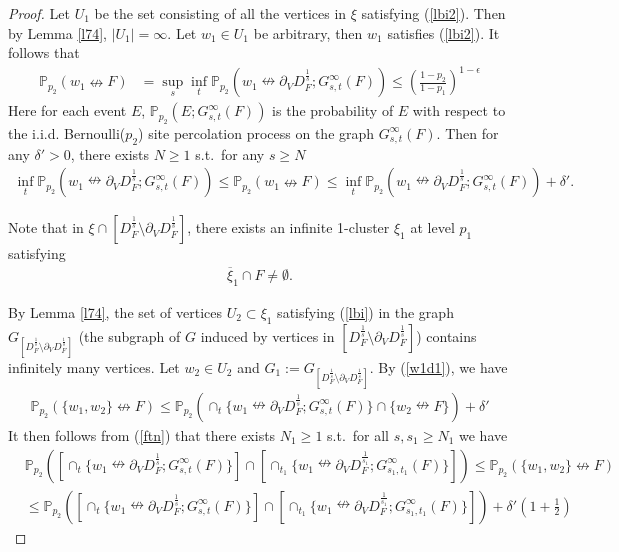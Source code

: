 \documentclass[11pt]{amsart}
\theoremstyle{plain}
\numberwithin{equation}{section}
\numberwithin{figure}{section}
\newcommand\ol{\overline}
\newcommand\PP{{\mathbb P}}
\begin{document}
\begin{proof}Let $U_1$ be the set consisting of all the vertices in $\xi$ satisfying (\ref{lbi2}). Then by Lemma \ref{l74}, $|U_1|=\infty$. Let $w_1\in U_1$ be arbitrary, then $w_1$ satisfies (\ref{lbi2}). It follows that
\begin{align}
\PP_{p_2}(w_1\nleftrightarrow F)
&=\sup_s\inf_t \PP_{p_2}(w_1\nleftrightarrow \partial_V D_F^{\frac{1}{s}};G_{s,t}^{\infty}(F))\leq \left(\frac{1-p_2}{1-p_1}\right)^{1-\epsilon}\label{ftn}
\end{align}
Here for each event $E$, $\PP_{p_2}(E;G_{s,t}^{\infty}(F))$ is the probability of $E$ with respect to the i.i.d. Bernoulli($p_2$) site percolation process on the graph $G_{s,t}^{\infty}(F)$.
Then for any $\delta'>0$, there exists $N\geq 1$ s.t.~for any $s\geq N$ 
\begin{align}
\inf_t\PP_{p_2}(w_1\nleftrightarrow \partial_V D_F^{\frac{1}{s}};G_{s,t}^{\infty}(F)) \leq\PP_{p_2}(w_1\nleftrightarrow F)\leq \inf_t\PP_{p_2}(w_1\nleftrightarrow \partial_V D_F^{\frac{1}{s}};G_{s,t}^{\infty}(F))+\delta'.\label{w1d1}
\end{align}



Note that in $\xi\cap \left[D_{F}^{\frac{1}{s}}\setminus \partial_V D_{F}^{\frac{1}{s}}\right]$, there exists an infinite 1-cluster $\xi_1$ at level $p_1$ satisfying
\begin{align*}
\ol{\xi}_1\cap F\neq \emptyset.
\end{align*}

By Lemma \ref{l74}, the set of vertices $U_2\subset \xi_1$ satisfying (\ref{lbi}) in the graph $G_{\left[D_{F}^{\frac{1}{s}}\setminus \partial_V D_{F}^{\frac{1}{s}}\right]}$ (the subgraph of $G$ induced by vertices in $\left[D_{F}^{\frac{1}{s}}\setminus \partial_V D_{F}^{\frac{1}{s}}\right]$) contains infinitely many vertices.
Let $w_2\in U_2$ and $G_1:=G_{\left[D_{F}^{\frac{1}{s}}\setminus \partial_V D_{F}^{\frac{1}{s}}\right]}$. By (\ref{w1d1}), we have 
\begin{align*}
\PP_{p_2}(\{w_1,w_2\}\nleftrightarrow F)
\leq \PP_{p_2}(\cap_t\{w_1\nleftrightarrow \partial_V D_F^{\frac{1}{s}};G_{s,t}^{\infty}(F)\}\cap\{w_2\nleftrightarrow  F\})+\delta'
\end{align*}
It then follows from (\ref{ftn}) that there exists $N_1\geq1$ s.t.~for all $s,s_1\geq N_1$ we have
\begin{align*}
&\PP_{p_2}([\cap_t\{w_1\nleftrightarrow \partial_V D_F^{\frac{1}{s}};G_{s,t}^{\infty}(F)\}]\cap[\cap_{t_1}\{w_1\nleftrightarrow \partial_V D_F^{\frac{1}{s_1}};G_{s_1,t_1}^{\infty}(F)\}])
\leq \PP_{p_2}(\{w_1,w_2\}\nleftrightarrow F)
\\&\leq \PP_{p_2}([\cap_t\{w_1\nleftrightarrow \partial_V D_F^{\frac{1}{s}};G_{s,t}^{\infty}(F)\}]\cap[\cap_{t_1}\{w_1\nleftrightarrow \partial_V D_F^{\frac{1}{s_1}};G_{s_1,t_1}^{\infty}(F)\}])+\delta'\left(1+\frac{1}{2}
\right)
\end{align*}


\end{proof}
\end{document}
